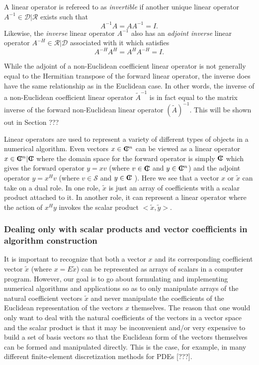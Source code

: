 A linear operator is refereed to as {}\textit{invertible} if another unique
linear operator $A^{-1}\in\mathcal{D}|\mathcal{R}$ exists such that
%
\[
A^{-1} A = A A^{-1} = I.
\]
%
Likewise, the {}\textit{inverse} linear operator $A^{-1}$ also has an
{}\textit{adjoint inverse} linear operator $A^{-H}\in\mathcal{R}|\mathcal{D}$
associated with it which satisfies
%
\[
A^{-H} A^H = A^H A^{-H} = I.
\]
%

While the adjoint of a non-Euclidean coefficient linear operator is not
generally equal to the Hermitian transpose of the forward linear operator, the
inverse does have the same relationship as in the Euclidean case.  In other
words, the inverse of a non-Euclidean coefficient linear operator
$\tilde{A}^{-1}$ is in fact equal to the matrix inverse of the forward
non-Euclidean linear operator $(\tilde{A})^{-1}$.  This will be shown out in
Section ???

Linear operators are used to represent a variety of different types of objects
in a numerical algorithm.  Even vectors $x\in\mbox{\textbf{C}}\hspace{-1.1ex}\mbox{l}\hspace{0.4ex}^n$ can be viewed as a
linear operator $x\in\mbox{\textbf{C}}\hspace{-1.1ex}\mbox{l}\hspace{0.4ex}^n|\mbox{\textbf{C}}\hspace{-1.1ex}\mbox{l}\hspace{0.4ex}$ where the domain space for the forward
operator is simply $\mbox{\textbf{C}}\hspace{-1.1ex}\mbox{l}\hspace{0.4ex}$ which gives the forward operator $y = x v$ (where
$v\in\mbox{\textbf{C}}\hspace{-1.1ex}\mbox{l}\hspace{0.4ex}$ and $y\in\mbox{\textbf{C}}\hspace{-1.1ex}\mbox{l}\hspace{0.4ex}^n$) and the adjoint operator $y = x^H v$ (where
$v\in\mathcal{S}$ and $y\in\mbox{\textbf{C}}\hspace{-1.1ex}\mbox{l}\hspace{0.4ex}$ ).  Here we see that a vector $x$ or
$\tilde{x}$ can take on a dual role.  In one role, $\tilde{x}$ is just an
array of coefficients with a scalar product attached to it.  In another role,
it can represent a linear operator where the action of $x^H y$ invokes the
scalar product $<\tilde{x},\tilde{y}>$.

\subsubsection{Dealing only with scalar products and vector coefficients in algorithm construction}

It is important to recognize that both a vector $x$ and its corresponding
coefficient vector $\tilde{x}$ (where $x = E\tilde{x}$) can be represented as
arrays of scalars in a computer program.  However, our goal is to go about
formulating and implementing numerical algorithms and applications so as to
only manipulate arrays of the natural coefficient vectors $\tilde{x}$ and
never manipulate the coefficients of the Euclidean representation of the
vectors $x$ themselves.  The reason that one would only want to deal with the
natural coefficients of the vectors in a vector space and the scalar product
is that it may be inconvenient and/or very expensive to build a set of basis
vectors so that the Euclidean form of the vectors themselves can be formed and
manipulated directly.  This is the case, for example, in many different
finite-element discretization methods for PDEs [???].

